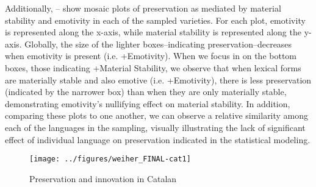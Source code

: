 \documentclass[output=paper,colorlinks,citecolor=brown,
]{langscibook}
\begin{document}
Additionally, -- show mosaic plots of preservation as mediated by material stability and emotivity in each of the sampled varieties. For each plot, emotivity is represented along the x-axis, while material stability is represented along the y-axis. Globally, the size of the lighter boxes–indicating preservation–decreases when emotivity is present (i.e. +Emotivity). When we focus in on the bottom boxes, those indicating +Material Stability, we observe that when lexical forms are materially stable and also emotive (i.e. +Emotivity), there is less preservation (indicated by the narrower box) than when they are only materially stable, demonstrating emotivity’s nullifying effect on material stability. In addition, comparing these plots to one another, we can observe a relative similarity among each of the languages in the sampling, visually illustrating the lack of significant effect of individual language on preservation indicated in the statistical modeling.




\begin{figure}[h]
    \texttt{[image: ../figures/weiher\_FINAL-cat1]}
    \caption{Preservation and innovation in Catalan}
    \label{fig:weiher:cat}
\end{figure}
\end{document}
